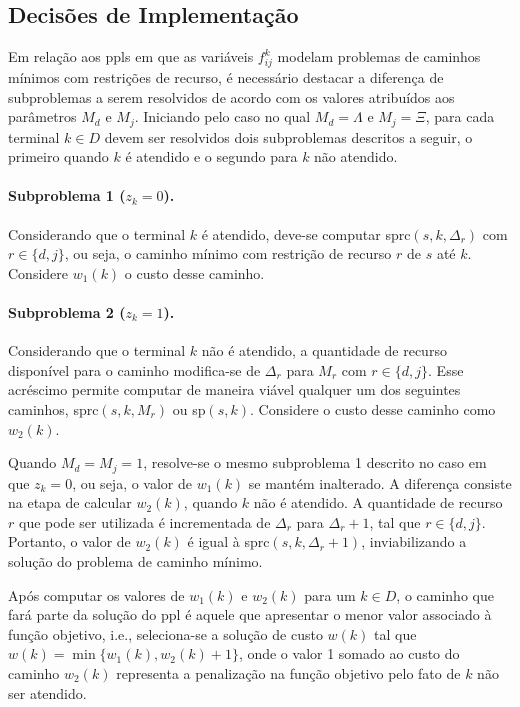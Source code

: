\subsection{Decisões de Implementação} \label{subsec:rl-m-valor}

Em relação aos \gls{ppl}s em que  as variáveis $f_{ij}^{k}$ modelam problemas de
caminhos mínimos com restrições de recurso, é necessário destacar a diferença de
subproblemas  a  serem  resolvidos  de  acordo com  os  valores  atribuídos  aos
parâmetros $M_d$ e $M_j$.  Iniciando pelo caso no qual $M_d =  \Lambda$ e $M_j =
\Xi$,  para cada  terminal  $k \in  D$ devem  ser  resolvidos dois  subproblemas
descritos a seguir,  o primeiro quando $k$  é atendido e o segundo  para $k$ não
atendido.

\noindent \paragraph*{Subproblema  1 ($z_k =  0$).} Considerando que  o terminal
$k$ é  atendido, deve-se computar \gls{sprc}$(s,  k, \Delta_r)$ com $r  \in \{d,
j\}$, ou  seja, o caminho mínimo  com restrição de  recurso $r$ de $s$  até $k$.
Considere $w_1(k)$ o custo desse caminho.

\noindent \paragraph*{Subproblema  2 ($z_k =  1$).} Considerando que  o terminal
$k$  não  é  atendido,  a  quantidade  de  recurso  disponível  para  o  caminho
modifica-se  de $\Delta_r$  para  $M_r$ com  $r \in  \{d,  j\}$. Esse  acréscimo
permite  computar  de  maneira  viável   qualquer  um  dos  seguintes  caminhos,
\gls{sprc}$(s, k,  M_r)$ ou  \gls{sp}$(s, k)$. Considere  o custo  desse caminho
como $w_2(k)$.

Quando $M_d = M_j = 1$, resolve-se o mesmo subproblema 1 descrito no caso em que
$z_k  = 0$,  ou seja,  o valor  de $w_1(k)$  se mantém  inalterado. A  diferença
consiste na etapa de calcular $w_2(k)$,  quando $k$ não é atendido. A quantidade
de  recurso  $r$ que  pode  ser  utilizada  é  incrementada de  $\Delta_r$  para
$\Delta_r + 1$, tal que $r \in \{d,  j\}$. Portanto, o valor de $w_2(k)$ é igual
à \gls{sprc}$(s,  k, \Delta_r  + 1)$,  inviabilizando a  solução do  problema de
caminho mínimo.

Após computar  os valores de  $w_1(k) \text{ e  } w_2(k)$ para  um $k \in  D$, o
caminho que fará parte  da solução do \gls{ppl} é aquele  que apresentar o menor
valor associado à função objetivo, i.e.,  seleciona-se a solução de custo $w(k)$
tal que  $w(k) =  \min\{w_1(k),w_2(k)+1\}$, onde  o valor 1  somado ao  custo do
caminho $w_2(k)$  representa a penalização na  função objetivo pelo fato  de $k$
não ser atendido.


